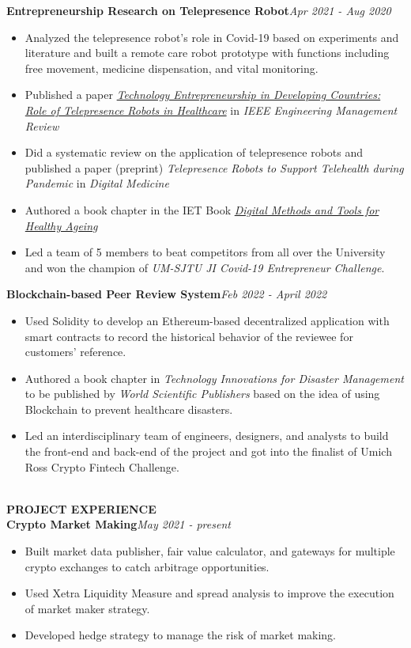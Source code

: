 \documentclass[10pt,a4paper]{article}
\begin{document}
\textbf{Entrepreneurship Research on Telepresence Robot}\hfill \emph{Apr 2021 - Aug 2020}
\begin{itemize}[noitemsep,topsep=0pt]
\item Analyzed the telepresence robot's role in Covid-19 based on experiments and literature and built a remote care robot prototype with functions including free movement, medicine dispensation, and vital monitoring.
\item Published a paper \href{https://ieeexplore.ieee.org/document/9330532}{\emph{Technology Entrepreneurship in Developing Countries: Role of Telepresence Robots in Healthcare}} in \emph{IEEE Engineering Management Review}
\item Did a systematic review on the application of telepresence robots and published a paper (preprint) \emph{Telepresence Robots to Support Telehealth during Pandemic} in \emph{Digital Medicine}
\item Authored a book chapter in the IET Book \href{https://shop.theiet.org/digital-tools-and-methods-to-support-healthy-ageing}{\emph{Digital Methods and Tools for Healthy Ageing}}
\item Led a team of 5 members to beat competitors from all over the University and won the champion of \emph{UM-SJTU JI Covid-19 Entrepreneur Challenge}.\\
\end{itemize}
\textbf{Blockchain-based Peer Review System}\hfill\emph{Feb 2022 - April 2022}
\begin{itemize}[noitemsep,topsep=0pt]
    \item Used Solidity to develop an Ethereum-based decentralized application with smart contracts to record the historical behavior of the reviewee for customers' reference.
    \item Authored a book chapter in \emph{Technology Innovations for Disaster Management} to be published by \emph{World Scientific Publishers} based on the idea of using Blockchain to prevent healthcare disasters.
    \item Led an interdisciplinary team of engineers, designers, and analysts to build the front-end and back-end of the project and got into the finalist of Umich Ross Crypto Fintech Challenge.
\end{itemize}
\noindent\\
\rlap{\rule[-1mm]{\linewidth}{.5mm}}\textbf{\large{PROJECT EXPERIENCE}}\\
\textbf{Crypto Market Making}\hfill \emph{May 2021 - present}
\begin{itemize}[noitemsep,topsep=0pt]
    \item Built market data publisher, fair value calculator, and gateways for multiple crypto exchanges to catch arbitrage opportunities.
    \item Used Xetra Liquidity Measure and spread analysis to improve the execution of market maker strategy.
    \item Developed hedge strategy to manage the risk of market making.
\end{itemize}
\end{document}
